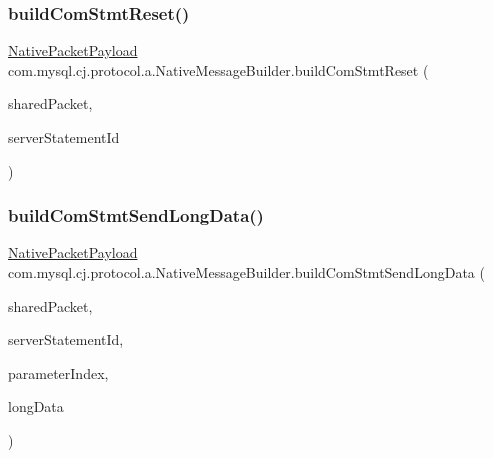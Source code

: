 \mbox{\label{classcom_1_1mysql_1_1cj_1_1protocol_1_1a_1_1_native_message_builder_a4acc76dd73bf697fc9757adf5e379682}} 
\subsubsection{\texorpdfstring{build\+Com\+Stmt\+Reset()}{buildComStmtReset()}}
{\footnotesize\ttfamily \mbox{\hyperlink{classcom_1_1mysql_1_1cj_1_1protocol_1_1a_1_1_native_packet_payload}{Native\+Packet\+Payload}} com.\+mysql.\+cj.\+protocol.\+a.\+Native\+Message\+Builder.\+build\+Com\+Stmt\+Reset (\begin{DoxyParamCaption}\item[{\mbox{\hyperlink{classcom_1_1mysql_1_1cj_1_1protocol_1_1a_1_1_native_packet_payload}{Native\+Packet\+Payload}}}]{shared\+Packet,  }\item[{long}]{server\+Statement\+Id }\end{DoxyParamCaption})}

\mbox{\label{classcom_1_1mysql_1_1cj_1_1protocol_1_1a_1_1_native_message_builder_a1b4d0f770f5d97e69682bdcaa9e1bd6e}} 
\subsubsection{\texorpdfstring{build\+Com\+Stmt\+Send\+Long\+Data()}{buildComStmtSendLongData()}}
{\footnotesize\ttfamily \mbox{\hyperlink{classcom_1_1mysql_1_1cj_1_1protocol_1_1a_1_1_native_packet_payload}{Native\+Packet\+Payload}} com.\+mysql.\+cj.\+protocol.\+a.\+Native\+Message\+Builder.\+build\+Com\+Stmt\+Send\+Long\+Data (\begin{DoxyParamCaption}\item[{\mbox{\hyperlink{classcom_1_1mysql_1_1cj_1_1protocol_1_1a_1_1_native_packet_payload}{Native\+Packet\+Payload}}}]{shared\+Packet,  }\item[{long}]{server\+Statement\+Id,  }\item[{int}]{parameter\+Index,  }\item[{byte \mbox{[}$\,$\mbox{]}}]{long\+Data }\end{DoxyParamCaption})}

